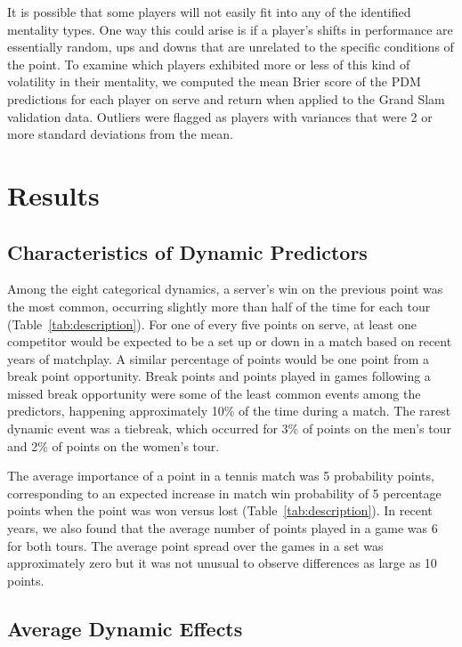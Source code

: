 \documentclass{Latex/svjour3}
\begin{document}
It is possible that some players will not easily fit into any of the identified
mentality types. One way this could arise is if a player's shifts in performance
are essentially random, ups and downs that are unrelated to the specific
conditions of the point. To examine which players exhibited more or less of this
kind of volatility in their mentality, we computed the mean Brier score of the
PDM predictions for each player on serve and return when applied to the Grand
Slam validation data. Outliers were flagged as players with variances that were
2 or more standard deviations from the mean.

\section{Results}

\subsection{Characteristics of Dynamic Predictors}

Among the eight categorical dynamics, a server's win on the previous point was
the most common, occurring slightly more than half of the time for each tour
(Table~\ref{tab:description}). For one of every five points on serve, at least
one competitor would be expected to be a set up or down in a match based on
recent years of matchplay. A similar percentage of points would be one point
from a break point opportunity. Break points and points played in games
following a missed break opportunity were some of the least common events among
the predictors, happening approximately 10\% of the time during a match. The
rarest dynamic event was a tiebreak, which occurred for 3\% of points on the
men's tour and 2\% of points on the women's tour.

The average importance of a point in a tennis match was 5 probability points,
corresponding to an expected increase in match win probability of 5 percentage
points when the point was won versus lost (Table~\ref{tab:description}). In
recent years, we also found that the average number of points played in a game
was 6 for both tours.   The average point
spread over the games in a set was approximately zero but it was not unusual to
observe differences as large as 10 points. 

\subsection{Average Dynamic Effects}
\end{document}
